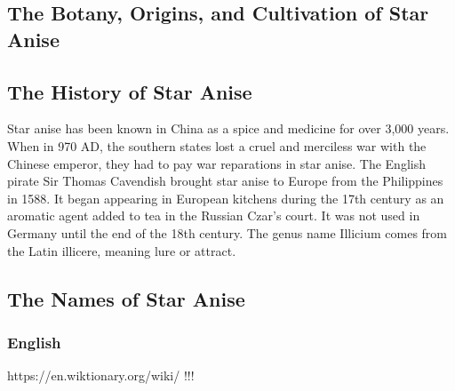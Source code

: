 


\subsection{The Botany, Origins, and Cultivation of Star Anise}

\subsection{The History of Star Anise}

Star anise has been known in China as a spice and medicine for over 3,000 years. When in 970 AD, the southern states lost a cruel and merciless war with the Chinese emperor, they had to pay war reparations in star anise. The English pirate Sir Thomas Cavendish brought star anise to Europe from the Philippines in 1588. It began appearing in European kitchens during the 17th century as an aromatic agent added to tea in the Russian Czar's court. It was not used in Germany until the end of the 18th century. The genus name Illicium comes from the Latin illicere, meaning lure or attract.


\subsection{The Names of Star Anise}

\subsubsection{English}

https://en.wiktionary.org/wiki/%
!!!


